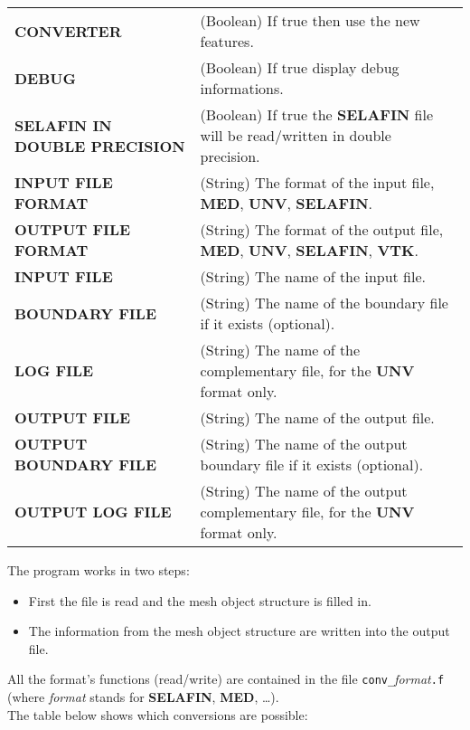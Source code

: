 \documentclass[a4paper,10pt]{article}
\newcommand{\slf}{\textbf{SELAFIN}\xspace}
\newcommand{\unv}{\textbf{UNV}\xspace}
\newcommand{\med}{\textbf{MED}\xspace}
\newcommand{\vtk}{\textbf{VTK}\xspace}
\begin{document}
\begin{tabular}{p{140pt}@{ : }p{200pt}}
\textbf{CONVERTER} & (Boolean) If true then use the new features.\\
\textbf{DEBUG} & (Boolean) If true display debug informations.\\
\textbf{SELAFIN IN DOUBLE PRECISION} & (Boolean) If true the \slf file will be read/written in double precision.\\
\textbf{INPUT FILE FORMAT} & (String) The format of the input file, \med, \unv, \slf.\\
\textbf{OUTPUT FILE FORMAT} & (String) The format of the output file, \med, \unv, \slf, \vtk.\\
\textbf{INPUT FILE} & (String) The name of the input file.\\
\textbf{BOUNDARY FILE} & (String) The name of the boundary file if it exists (optional).\\
\textbf{LOG FILE} & (String) The name of the complementary file, for the \unv format only.\\
\textbf{OUTPUT FILE} & (String) The name of the output file.\\
\textbf{OUTPUT BOUNDARY FILE} & (String) The name of the output boundary file if it exists (optional).\\
\textbf{OUTPUT LOG FILE} & (String) The name of the output complementary file, for the \unv format only.\\
\end{tabular}

The program works in two steps:
\begin{itemize}
\setlength{\itemsep}{1pt}
\setlength{\parskip}{0pt}
\setlength{\parsep}{0pt}
\item First the file is read and the mesh object structure is filled in.
\item The information from the mesh object structure are written into the
output file.
\end{itemize}

All the format's functions (read/write) are contained in the file
\verb+conv_+\textit{format}\verb+.f+ (where \textit{format} stands for \slf,
\med, \ldots).\\

The table below shows which conversions are possible:
\end{document}

